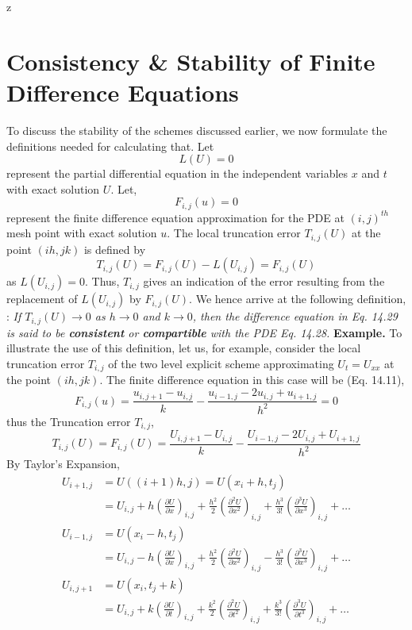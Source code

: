 z\documentclass[a4paper,12pt,twoside]{book}
\newcommand{\nll}[0]{\newline\newline}
\newcommand{\tit}[1]{\textit{#1}}
\newcommand{\defin}[0]{\boxed{\textbf{\textit{Definition}}}}
\newcommand{\pder}[2]{\frac{\partial #1}{\partial #2}}
\newcommand{\bpder}[3]{\left( \pder{#1}{#2}\right)_{#3}}
\begin{document}
\section{Consistency \& Stability of Finite Difference Equations}
To discuss the stability of the schemes discussed earlier, we now formulate the definitions needed for calculating that.
\nll
Let
\begin{equation}
    L(U) = 0
\end{equation}
represent the partial differential equation in the independent variables $x$ and $t$ with exact solution $U$. Let,
\begin{equation}
    F_{i,j} (u) = 0
\end{equation}
represent the finite difference equation approximation for the PDE at $(i,j)^{th}$ mesh point with exact solution $u$.
\nll
The local truncation error $T_{i,j}(U)$ at the point $(ih,jk)$ is defined by
\[T_{i,j}(U) = F_{i,j}(U) - L(U_{i,j}) = F_{i,j}(U)\]
as $L(U_{i,j}) = 0$. Thus, $T_{i,j}$ gives an indication of the error resulting from the replacement of $L(U_{i,j})$ by $F_{i,j}(U)$. We hence arrive at the following definition,
\nll
\defin  \;:  \tit{If $T_{i,j} (U) \to 0$ as $h\to 0$ and $k\to 0$, then the difference equation in Eq. 14.29 is said to be \textbf{consistent} or \textbf{compartible} with the PDE Eq. 14.28.}
\nll
\textbf{Example.} To illustrate the use of this definition, let us, for example, consider the local truncation error $T_{i,j}$ of the two level explicit scheme approximating $U_t = U_{xx}$ at the point $(ih,jk)$.
\nll
The finite difference equation in this case will be (Eq. 14.11),
\[F_{i,j}(u) = \frac{u_{i,j+1} - u_{i,j}}{k} - \frac{u_{i-1,j} - 2u_{i,j} + u_{i+1,j}}{h^2}= 0\]
thus the Truncation error $T_{i,j}$,
\begin{equation}
    T_{i,j}(U) = F_{i,j}(U) = \frac{U_{i,j+1} - U_{i,j}}{k} - \frac{U_{i-1,j} - 2U_{i,j} + U_{i+1,j}}{h^2}
\end{equation}
By Taylor's Expansion,
\begin{equation}
\begin{split}
    U_{i+1,j} &= U((i+1)h,j) = U(x_i + h,t_j)\\
    &= U_{i,j} + h\bpder{U}{x}{i,j} + \frac{h^2}{2} \bpder{^2U}{x^2}{i,j} + \frac{h^3}{3!} \bpder{^3U}{x^3}{i,j} + \dots\\
    U_{i-1,j} &= U(x_i - h,t_j)\\
    &= U_{i,j} - h\bpder{U}{x}{i,j} + \frac{h^2}{2} \bpder{^2U}{x^2}{i,j} - \frac{h^3}{3!} \bpder{^3U}{x^3}{i,j} + \dots\\
    U_{i,j+1} &= U(x_i,t_j + k)\\
    &= U_{i,j} + k\bpder{U}{t}{i,j} + \frac{k^2}{2} \bpder{^2U}{t^2}{i,j} + \frac{k^3}{3!} \bpder{^3U}{t^3}{i,j} + \dots
\end{split}
\end{equation}
\end{document}

